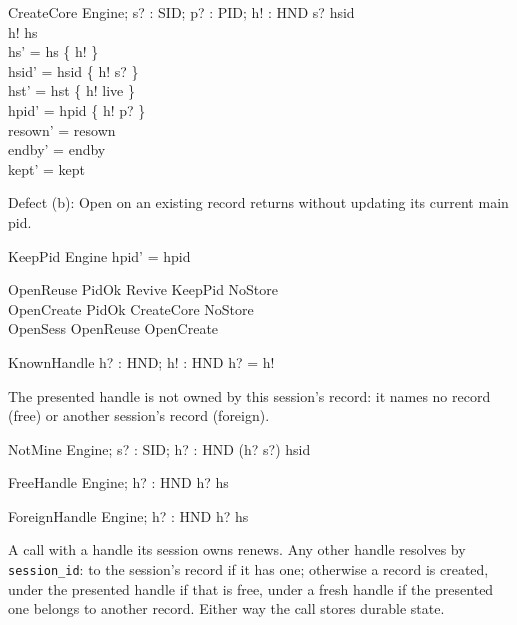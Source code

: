 \documentclass[a4paper,10pt,fleqn]{article}
\begin{document}
\begin{schema}{CreateCore}
  \Delta Engine; s? : SID; p? : PID; h! : HND
\where
  s? \notin \ran hsid \\
  h! \notin hs \\
  hs' = hs \cup \{ h! \} \\
  hsid' = hsid \cup \{ h! \mapsto s? \} \\
  hst' = hst \cup \{ h! \mapsto live \} \\
  hpid' = hpid \cup \{ h! \mapsto p? \} \\
  resown' = resown \\
  endby' = endby \\
  kept' = kept
\end{schema}

Defect (b): Open on an existing record returns without updating its current
main pid.

\begin{schema}{KeepPid}
  \Delta Engine
\where
  hpid' = hpid
\end{schema}

\begin{zed}
  OpenReuse  PidOk \land Revive \land KeepPid \land NoStore \\
  OpenCreate  PidOk \land CreateCore \land NoStore \\
  OpenSess  OpenReuse \lor OpenCreate
\end{zed}

\begin{schema}{KnownHandle}
  h? : HND; h! : HND
\where
  h? = h!
\end{schema}

The presented handle is not owned by this session's record: it names no record
(free) or another session's record (foreign).

\begin{schema}{NotMine}
  Engine; s? : SID; h? : HND
\where
  (h? \mapsto s?) \notin hsid
\end{schema}

\begin{schema}{FreeHandle}
  Engine; h? : HND
\where
  h? \notin hs
\end{schema}

\begin{schema}{ForeignHandle}
  Engine; h? : HND
\where
  h? \in hs
\end{schema}

A call with a handle its session owns renews.  Any other handle resolves by
\texttt{session\_id}: to the session's record if it has one; otherwise a record
is created, under the presented handle if that is free, under a fresh handle if
the presented one belongs to another record.  Either way the call stores
durable state.
\end{document}
